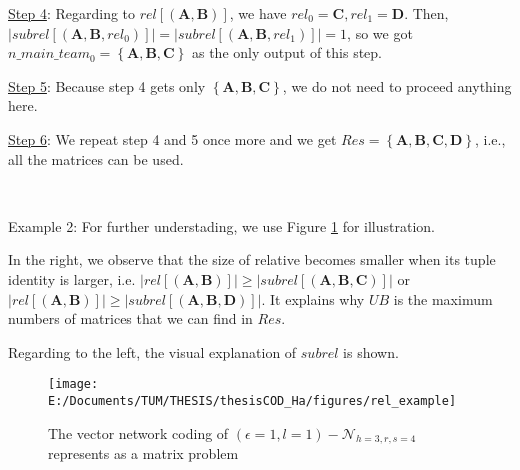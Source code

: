 \uline{Step 4}: Regarding to $rel\left[\left(\boldsymbol{A},\boldsymbol{B}\right)\right]$,
we have $rel_{0}=\boldsymbol{C},rel_{1}=\boldsymbol{D}$. Then, $\left|subrel\left[\left(\boldsymbol{A},\boldsymbol{B},rel_{0}\right)\right]\right|=\left|subrel\left[\left(\boldsymbol{A},\boldsymbol{B},rel_{1}\right)\right]\right|=1$,
so we got $n\_main\_team_{0}=\left\{ \boldsymbol{A},\boldsymbol{B},\boldsymbol{C}\right\} $
as the only output of this step.

\uline{Step 5}: Because step 4 gets only $\left\{ \boldsymbol{A},\boldsymbol{B},\boldsymbol{C}\right\} $,
we do not need to proceed anything here.

\uline{Step 6}: We repeat step 4 and 5 once more and we get $Res=\left\{ \boldsymbol{A},\boldsymbol{B},\boldsymbol{C},\boldsymbol{D}\right\} $,
i.e., all the matrices can be used.

~

Example 2: For further understading, we use Figure \ref{fig:rel_example}
for illustration.

In the right, we observe that the size of relative becomes smaller
when its tuple identity is larger, i.e. $\left|rel\left[\left(\boldsymbol{A},\boldsymbol{B}\right)\right]\right|\geq\left|subrel\left[\left(\boldsymbol{A},\boldsymbol{B},\boldsymbol{C}\right)\right]\right|$
or $\left|rel\left[\left(\boldsymbol{A},\boldsymbol{B}\right)\right]\right|\geq\left|subrel\left[\left(\boldsymbol{A},\boldsymbol{B},\boldsymbol{D}\right)\right]\right|$.
It explains why $UB$ is the maximum numbers of matrices that we can
find in $Res$.

Regarding to the left, the visual explanation of $subrel$ is shown.

\begin{figure}[H]
\caption{The vector network coding of $(\epsilon=1,l=1)-\mathcal{N}_{h=3,r,s=4}$
represents as a matrix problem\label{fig:rel_example}}

\centering{}\texttt{[image: E:/Documents/TUM/THESIS/thesisCOD\_Ha/figures/rel\_example]}
\end{figure}

\clearpage